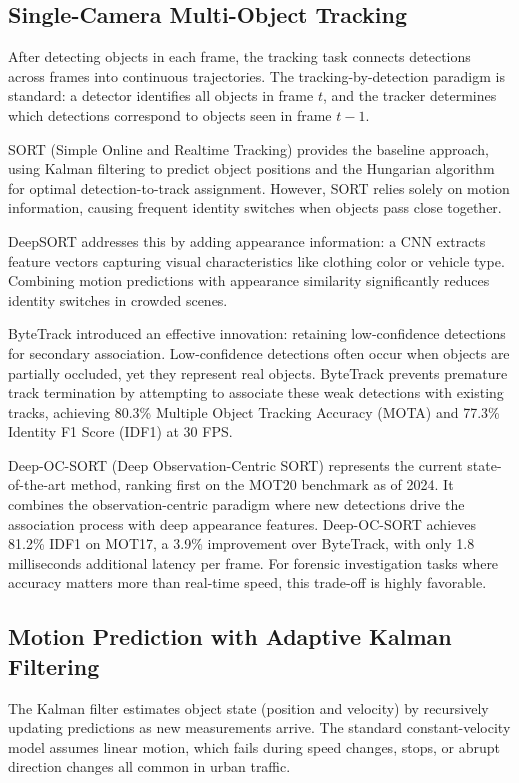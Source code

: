 \subsection{Single-Camera Multi-Object Tracking}

After detecting objects in each frame, the tracking task connects detections across frames into continuous trajectories. The tracking-by-detection paradigm is standard: a detector identifies all objects in frame $t$, and the tracker determines which detections correspond to objects seen in frame $t-1$.

SORT (Simple Online and Realtime Tracking) provides the baseline approach, using Kalman filtering to predict object positions and the Hungarian algorithm for optimal detection-to-track assignment. However, SORT relies solely on motion information, causing frequent identity switches when objects pass close together.

DeepSORT addresses this by adding appearance information: a CNN extracts feature vectors capturing visual characteristics like clothing color or vehicle type. Combining motion predictions with appearance similarity significantly reduces identity switches in crowded scenes.

ByteTrack introduced an effective innovation: retaining low-confidence detections for secondary association. Low-confidence detections often occur when objects are partially occluded, yet they represent real objects. ByteTrack prevents premature track termination by attempting to associate these weak detections with existing tracks, achieving 80.3\% Multiple Object Tracking Accuracy (MOTA) and 77.3\% Identity F1 Score (IDF1) at 30 FPS.

Deep-OC-SORT (Deep Observation-Centric SORT) represents the current state-of-the-art method, ranking first on the MOT20 benchmark as of 2024. It combines the observation-centric paradigm where new detections drive the association process with deep appearance features. Deep-OC-SORT achieves 81.2\% IDF1 on MOT17, a 3.9\% improvement over ByteTrack, with only 1.8 milliseconds additional latency per frame. For forensic investigation tasks where accuracy matters more than real-time speed, this trade-off is highly favorable.

\subsection{Motion Prediction with Adaptive Kalman Filtering}

The Kalman filter estimates object state (position and velocity) by recursively updating predictions as new measurements arrive. The standard constant-velocity model assumes linear motion, which fails during speed changes, stops, or abrupt direction changes all common in urban traffic.


